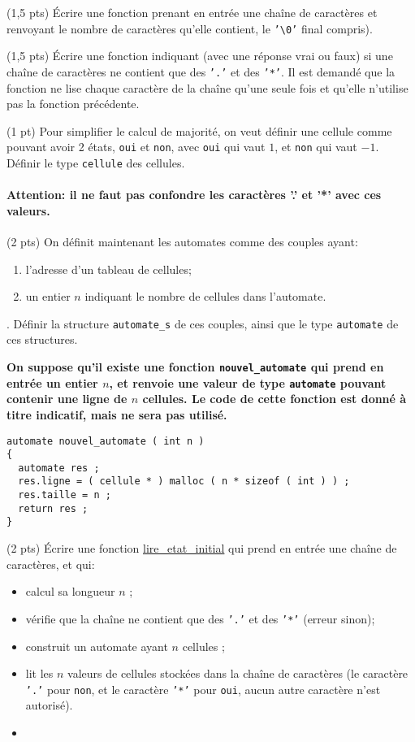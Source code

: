 \vspace*{1em}

\question (1,5 pts) Écrire une fonction prenant en entrée une chaîne de
caractères et renvoyant le nombre de caractères qu'elle contient, le
\texttt{'\textbackslash 0'} final compris).

\question (1,5 pts) Écrire une fonction indiquant (avec une réponse vrai
ou faux) si une chaîne de caractères ne contient que des \texttt{'.'}
et des \texttt{'*'}. Il est demandé que la fonction ne lise chaque caractère
de la chaîne qu'une seule fois et qu'elle n'utilise pas la fonction précédente.

\question (1 pt) Pour simplifier le calcul de majorit{\'e}, on veut
d{\'e}finir une cellule comme pouvant avoir 2 {\'e}tats, \texttt{oui}
et \texttt{non}, avec \texttt{oui} qui vaut $1$, et \texttt{non} qui
vaut $-1$. D{\'e}finir le type \texttt{cellule} des
cellules. \paragraph{Attention: il ne faut pas confondre les
  caractères '.' et '*' avec ces valeurs.}


\question (2 pts) On d{\'e}finit maintenant les automates comme des
couples ayant:
\begin{enumerate}
\item l'adresse d'un tableau de cellules;
\item un entier $n$ indiquant le nombre de cellules dans l'automate.
\end{enumerate}.
D{\'e}finir la structure \texttt{automate\_s} de ces couples, ainsi que le type 
\texttt{automate} de ces structures.


{\bf On suppose qu'il existe une fonction \texttt{nouvel\_automate}
  qui prend en entrée un entier \(n\), et renvoie une valeur de type
  \texttt{automate} pouvant contenir une ligne de \(n\)
  cellules. Le code de cette fonction est donné à titre indicatif, mais ne sera pas utilisé.}

\begin{lstlisting}
automate nouvel_automate ( int n )
{
  automate res ;
  res.ligne = ( cellule * ) malloc ( n * sizeof ( int ) ) ;
  res.taille = n ;
  return res ;
}
\end{lstlisting}

\question (2 pts) {\'E}crire une fonction \url{lire_etat_initial} qui
prend en entr{\'e}e une chaîne de caractères, et qui:
\begin{itemize}
\item calcul sa longueur \(n\) ;
\item vérifie que la chaîne ne contient que des \texttt{'.'}
et des \texttt{'*'} (erreur sinon);
\item construit un automate ayant \(n\) cellules ;
\item lit les $n$ valeurs de cellules stock{\'e}es dans la chaîne de caractères
(le caract{\`e}re \texttt{'.'} pour \texttt{non}, et le caract{\`e}re 
\texttt{'*'} pour \texttt{oui}, aucun autre caract{\`e}re n'est autoris{\'e}).
\item 
\end{itemize}

